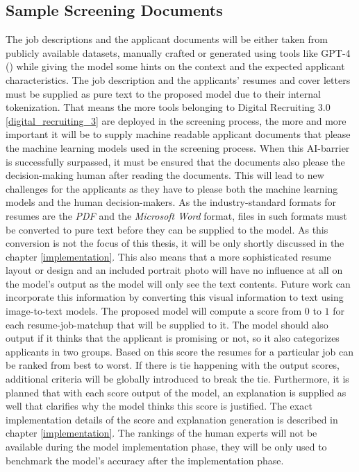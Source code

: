 \documentclass[draft,final]{thesisclass} %
\begin{document}
\subsection{Sample Screening Documents}
The job descriptions and the applicant documents will be either taken from publicly available datasets, manually crafted or generated using tools like GPT-4 (\cite{gpt4}) while giving the model some hints on the context and the expected applicant characteristics.
The job description and the applicants' resumes and cover letters must be supplied as pure text to the proposed model due to their internal tokenization.
That means the more tools belonging to Digital Recruiting 3.0 \ref{digital_recruiting_3} are deployed in the screening process, the more and more important it will be to supply machine readable applicant documents that please the machine learning models used in the screening process.
When this AI-barrier is successfully surpassed, it must be ensured that the documents also please the decision-making human after reading the documents.
This will lead to new challenges for the applicants as they have to please both the machine learning models and the human decision-makers.
As the industry-standard formats for resumes are the \textit{PDF} and the \textit{Microsoft Word} format, files in such formats must be converted to pure text before they can be supplied to the model.
As this conversion is not the focus of this thesis, it will be only shortly discussed in the chapter \ref{implementation}.
This also means that a more sophisticated resume layout or design and an included portrait photo will have no influence at all on the model's output as the model will only see the text contents.
Future work can incorporate this information by converting this visual information to text using image-to-text models.
The proposed model will compute a score from $0$ to $1$ for each resume-job-matchup that will be supplied to it.
The model should also output if it thinks that the applicant is promising or not, so it also categorizes applicants in two groups.
Based on this score the resumes for a particular job can be ranked from best to worst.
If there is tie happening with the output scores, additional criteria will be globally introduced to break the tie.
Furthermore, it is planned that with each score output of the model, an explanation is supplied as well that clarifies why the model thinks this score is justified.
The exact implementation details of the score and explanation generation is described in chapter \ref{implementation}.
The rankings of the human experts will not be available during the model implementation phase, they will be only used to benchmark the model's accuracy after the implementation phase.
\end{document}
